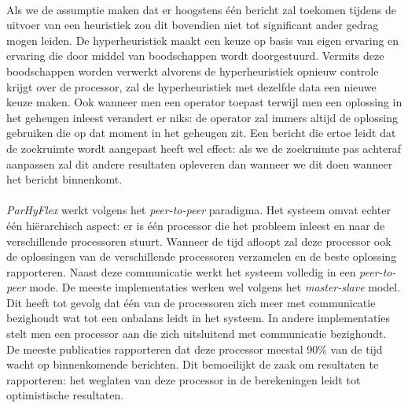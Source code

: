 \paragraph{}%
Als we de assumptie maken dat er hoogstens \'e\'en bericht zal toekomen tijdens de uitvoer van een heuristiek zou dit bovendien niet tot significant ander gedrag mogen leiden. De hyperheuristiek maakt een keuze op basis van eigen ervaring en ervaring die door middel van boodschappen wordt doorgestuurd. Vermits deze boodschappen worden verwerkt alvorens de hyperheuristiek opnieuw controle krijgt over de processor, zal de hyperheuristiek met dezelfde data een nieuwe keuze maken. Ook wanneer men een operator toepast terwijl men een oplossing in het geheugen inleest verandert er niks: de operator zal immers altijd de oplossing gebruiken die op dat moment in het geheugen zit. Een bericht die ertoe leidt dat de zoekruimte wordt aangepast heeft wel effect: als we de zoekruimte pas achteraf aanpassen zal dit andere resultaten opleveren dan wanneer we dit doen wanneer het bericht binnenkomt.

\paragraph{}
\emph{ParHyFlex} werkt volgens het \emph{peer-to-peer} paradigma. Het systeem omvat echter \'e\'en hi\"erarchisch aspect: er is \'e\'en processor die het probleem inleest en naar de verschillende processoren stuurt. Wanneer de tijd afloopt zal deze processor ook de oplossingen van de verschillende processoren verzamelen en de beste oplossing rapporteren. Naast deze communicatie werkt het systeem volledig in een \emph{peer-to-peer} mode. De meeste implementaties werken wel volgens het \emph{master-slave} model\cite{conf/gecco/LeonMS08,conf/pdp/SeguraSL12}. Dit heeft tot gevolg dat \'e\'en van de processoren zich meer met communicatie bezighoudt wat tot een onbalans leidt in het systeem. In andere implementaties\cite{Rattadilok04adistributed} stelt men een processor aan die zich uitsluitend met communicatie bezighoudt. De meeste publicaties rapporteren dat deze processor meestal 90\% van de tijd wacht op binnenkomende berichten. Dit bemoeilijkt de zaak om resultaten te rapporteren: het weglaten van deze processor in de berekeningen leidt tot optimistische resultaten.